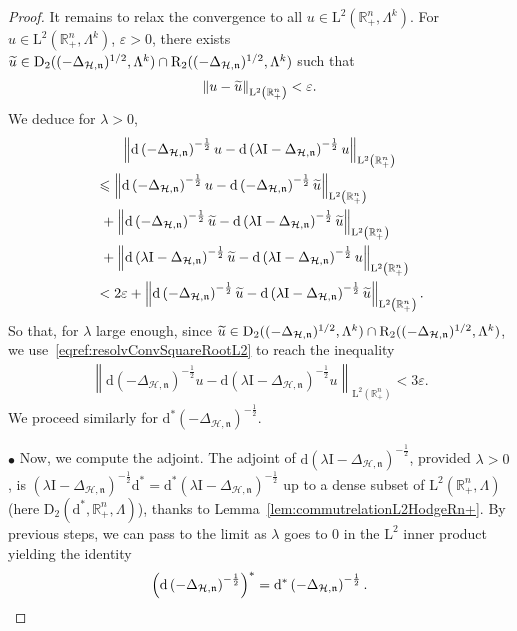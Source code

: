 \documentclass[AHL,Unicode,longabstracts,published]{cedram}
\newcommand{\bbR}{\mathbb{R}}
\newcommand{\rmd}{\mathrm{d}}
\newcommand{\rmD}{\mathrm{D}}
\newcommand{\rmL}{\mathrm{L}}
\newcommand{\rmR}{\mathrm{R}}
\newcommand{\rmI}{\mathrm{I}}
\newcommand{\clH}{\mathcal{H}}
\newcommand{\fkn}{\mathfrak{n}}
\let\oldtilde\tilde
\renewcommand*{\tilde}[1]{\mathchoice{\widetilde{#1}}{\widetilde{#1}}{\oldtilde{#1}}{\oldtilde{#1}}}
\begin{document}
\begin{proof}
It remains to relax the convergence to all $u\in\rmL^2(\bbR^n_+,\Lambda^k)$. For $u\in\rmL^2(\bbR^n_+,\Lambda^k)$, $\varepsilon>0$, there exists $\tilde{u}\in\rmD_2((-\Delta_{\clH,\fkn})^{1/2},\Lambda^k)\cap\rmR_2((-\Delta_{\clH,\fkn})^{1/2},\Lambda^k) $ such that
\begin{align*}
\| u-\Tilde{u} \|_{\rmL^2\left(\bbR^n_+\right)}<\varepsilon.
\end{align*}
We deduce for $\lambda >0$,
\begin{multline*}
\left\| \rmd\left(-\Delta_{\clH,\fkn}\right)^{-\frac{1}{2}} u - \rmd\left(\lambda\rmI -\Delta_{\clH,\fkn}\right)^{-\frac{1}{2}} u\right\|_{\rmL^2\left(\bbR^n_+\right)}\\
\begin{aligned}
&\leqslant \left\| \rmd\left(-\Delta_{\clH,\fkn}\right)^{-\frac{1}{2}} u - \rmd\left(-\Delta_{\clH,\fkn}\right)^{-\frac{1}{2}} \tilde{u}\right\|_{\rmL^2\left(\bbR^n_+\right)}\\
&\,\,+\left\| \rmd\left(-\Delta_{\clH,\fkn}\right)^{-\frac{1}{2}} \tilde{u} - \rmd\left(\lambda\rmI -\Delta_{\clH,\fkn}\right)^{-\frac{1}{2}} \tilde{u}\right\|_{\rmL^2\left(\bbR^n_+\right)}\\
&\,\,+\left\| \rmd\left(\lambda\rmI -\Delta_{\clH,\fkn}\right)^{-\frac{1}{2}} \tilde{u} - \rmd\left(\lambda\rmI -\Delta_{\clH,\fkn}\right)^{-\frac{1}{2}} u\right\|_{\rmL^2\left(\bbR^n_+\right)}\\
&<2\varepsilon + \left\| \rmd\left(-\Delta_{\clH,\fkn}\right)^{-\frac{1}{2}} \tilde{u} - \rmd\left(\lambda\rmI -\Delta_{\clH,\fkn}\right)^{-\frac{1}{2}} \tilde{u}\right\|_{\rmL^2\left(\bbR^n_+\right)}.
\end{aligned}
\end{multline*}
So that, for $\lambda$ large enough, since $\tilde{u}\in\rmD_2((-\Delta_{\clH,\fkn})^{1/2},\Lambda^k)\cap\rmR_2((-\Delta_{\clH,\fkn})^{1/2},\Lambda^k)$, we use~\eqref{eqref:resolvConvSquareRootL2} to reach the inequality
\begin{align*}
\left\| \rmd\left(-\Delta_{\clH,\fkn}\right)^{-\frac{1}{2}} u - \rmd\left(\lambda\rmI -\Delta_{\clH,\fkn}\right)^{-\frac{1}{2}} u\right\|_{\rmL^2\left(\bbR^n_+\right)}<3\varepsilon.
\end{align*}
We proceed similarly for $ \rmd^\ast(-\Delta_{\clH,\fkn})^{-\frac{1}{2}}$.


$\bullet$ Now, we compute the adjoint. The adjoint of $\rmd(\lambda\rmI -\Delta_{\clH,\fkn})^{-\frac{1}{2}}$, provided $\lambda>0$, is $(\lambda\rmI -\Delta_{\clH,\fkn})^{-\frac{1}{2}}\rmd^\ast=\rmd^\ast(\lambda\rmI -\Delta_{\clH,\fkn})^{-\frac{1}{2}}$ up to a dense subset of $\rmL^2(\bbR^n_+,\Lambda)$ (here $\rmD_2(\rmd^\ast,\bbR^n_+,\Lambda)$), thanks to Lemma~\ref{lem:commutrelationL2HodgeRn+}. By previous steps, we can pass to the limit as $\lambda$ goes to $0$ in the $\rmL^2$ inner product yielding the identity
\[
\left(\rmd\left(-\Delta_{\clH,\fkn}\right)^{-\frac{1}{2}}\right)^\ast = \rmd^\ast\left(-\Delta_{\clH,\fkn}\right)^{-\frac{1}{2}} .\qedhere
\]
\end{proof}
\end{document}

